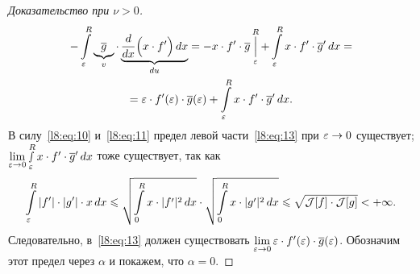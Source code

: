 \begin{proof}[Доказательство при $\nu>0$]
\begin{multline}
		-\int\limits_{\varepsilon}^R\underbrace{\overline{g}}_{v}\cdot\underbrace{\frac{d}{dx}\Big(x\cdot f'\Big)\,dx}_{du}=-x\cdot f'\cdot\overline{g}\mathop{\Big|}\limits_{\varepsilon}^R+\int\limits_{\varepsilon}^R x\cdot f'\cdot\overline{g}'\,dx=\\=\varepsilon\cdot f'(\varepsilon)\cdot\overline{g}(\varepsilon)+\int\limits_{\varepsilon}^R x\cdot f'\cdot\overline{g}'\,dx.
	\end{multline}
	В силу~\eqref{l8:eq:10} и~\eqref{l8:eq:11} предел левой части~\eqref{l8:eq:13} при $\varepsilon\to0$ существует; $\lim\limits_{\varepsilon\to0}\smallint\limits_{\varepsilon}^R x\cdot f'\cdot\overline{g}'\,dx$ тоже существует, так как 
	\begin{equation*}
		\int\limits_{\varepsilon}^{R}|f'|\cdot|g'|\cdot x\,dx\leqslant\sqrt{\int\limits_{0}^{R}x\cdot|f'|^2\,dx}\cdot\sqrt{\int\limits_{0}^{R}x\cdot|g'|^2\,dx}\leqslant\sqrt{\mathcal{J}[f]\cdot\mathcal{J}[g]}<+\infty.
	\end{equation*}
	Следовательно{\mb,} в~\eqref{l8:eq:13} должен существовать $\lim\limits_{\varepsilon\to0}\varepsilon\cdot f'(\varepsilon)\cdot\overline{g}(\varepsilon)$. Обозначим этот предел через $\alpha$ и покажем, что $\alpha=0$.
	

\end{proof}
